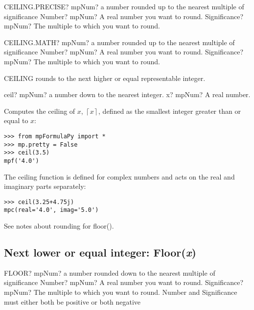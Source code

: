 \vspace{0.6cm}
\begin{mpFunctionsExtract}
	\mpWorksheetFunctionTwoNotImplemented
	{CEILING.PRECISE? mpNum? a number rounded up to the nearest multiple of significance}
	{Number? mpNum? A real number you want to round.}
	{Significance? mpNum? The multiple to which you want to round.}
\end{mpFunctionsExtract}


\vspace{0.6cm}
\begin{mpFunctionsExtract}
	\mpWorksheetFunctionTwoNotImplemented
	{CEILING.MATH? mpNum? a number rounded up to the nearest multiple of significance}
	{Number? mpNum? A real number you want to round.}
	{Significance? mpNum? The multiple to which you want to round.}
\end{mpFunctionsExtract}

\vspace{0.3cm}
CEILING rounds to the next higher or equal representable integer.


\begin{mpFunctionsExtract}
	\mpFunctionOne
	{ceil? mpNum?  a number down to the nearest integer.}
	{x? mpNum? A real number.}
\end{mpFunctionsExtract}


\vpara
Computes the ceiling of $x$, $\left\lceil x \right\rceil $, defined as the smallest integer greater than or equal to $x$:

\begin{lstlisting}
>>> from mpFormulaPy import *
>>> mp.pretty = False
>>> ceil(3.5)
mpf('4.0')
\end{lstlisting}


The ceiling function is defined for complex numbers and acts on the real and imaginary parts separately:

\begin{lstlisting}
>>> ceil(3.25+4.75j)
mpc(real='4.0', imag='5.0')
\end{lstlisting}

See notes about rounding for floor().



\subsection{Next lower or equal integer: Floor(\textit{x})}


\begin{mpFunctionsExtract}
	\mpWorksheetFunctionTwoNotImplemented
	{FLOOR? mpNum? a number rounded down to the nearest multiple of significance}
	{Number? mpNum? A real number you want to round.}
	{Significance? mpNum? The multiple to which you want to round. Number and Significance must either both be positive or both negative}
\end{mpFunctionsExtract}


